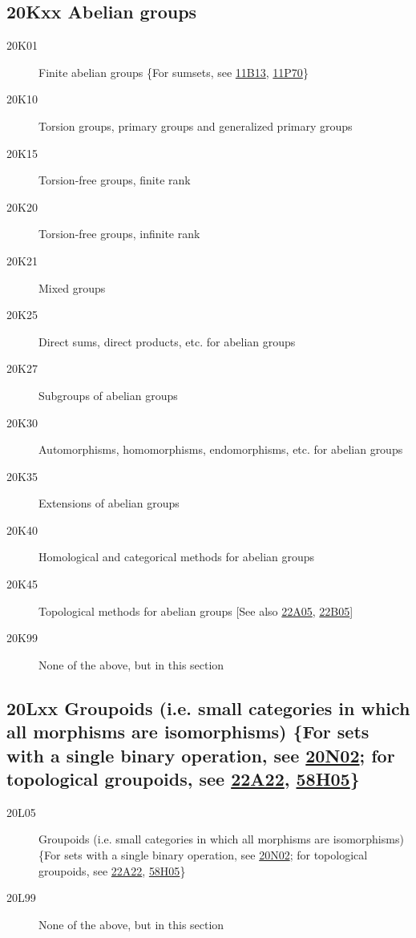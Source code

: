 \subsection*{20Kxx  Abelian groups }\label{20Kxx}
\begin{description}
\item [20K01]\label{20K01} Finite abelian groups \{For sumsets, see \hyperref[11B13]{11B13}, \hyperref[11P70]{11P70}\}
\item [20K10]\label{20K10} Torsion groups, primary groups and generalized primary groups
\item [20K15]\label{20K15} Torsion-free groups, finite rank
\item [20K20]\label{20K20} Torsion-free groups, infinite rank
\item [20K21]\label{20K21} Mixed groups
\item [20K25]\label{20K25} Direct sums, direct products, etc. for abelian groups
\item [20K27]\label{20K27} Subgroups of abelian groups
\item [20K30]\label{20K30} Automorphisms, homomorphisms, endomorphisms, etc. for abelian groups
\item [20K35]\label{20K35} Extensions of abelian groups
\item [20K40]\label{20K40} Homological and categorical methods for abelian groups
\item [20K45]\label{20K45} Topological methods for abelian groups [See also \hyperref[22A05]{22A05}, \hyperref[22B05]{22B05}]
\item [20K99]\label{20K99} None of the above, but in this section
\end{description}
\subsection*{20Lxx  Groupoids (i.e. small categories in which all morphisms are isomorphisms) \{For sets with a single binary operation, see \hyperref[20N02]{20N02}; for topological groupoids, see \hyperref[22A22]{22A22}, \hyperref[58H05]{58H05}\} }\label{20Lxx}
\begin{description}  
\item [20L05]\label{20L05} Groupoids (i.e. small categories in which all morphisms are isomorphisms) \{For sets with a single binary operation, see \hyperref[20N02]{20N02}; for topological groupoids, see \hyperref[22A22]{22A22}, \hyperref[58H05]{58H05}\}
\item [20L99]\label{20L99} None of the above, but in this section
\end{description}
